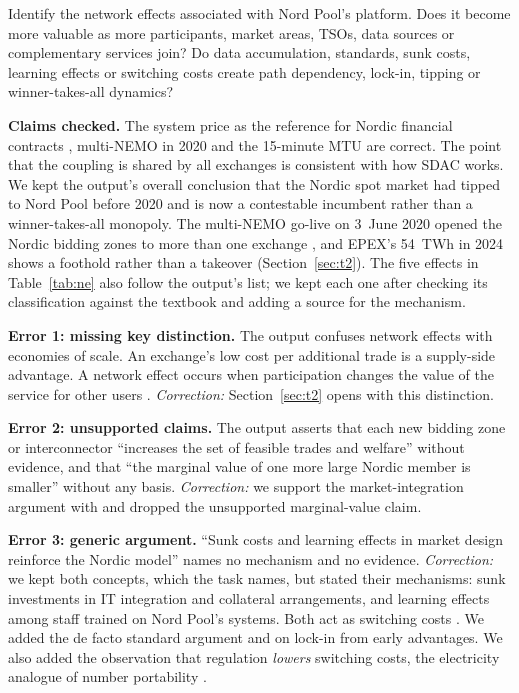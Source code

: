 \begin{promptbox}
Identify the network effects associated with Nord Pool's
platform. Does it become more valuable as more participants,
market areas, TSOs, data sources or complementary services
join? Do data accumulation, standards, sunk costs,
learning effects or switching costs create path dependency,
lock-in, tipping or winner-takes-all dynamics?
\end{promptbox}

\textbf{Claims checked.} The system price as the reference
for Nordic financial contracts \citep{NPPrice},
multi-NEMO in 2020 \citep{EPEX2020} and the 15-minute
MTU \citep{OTE2025} are correct.
The point that the coupling is shared by all exchanges
is consistent with how SDAC works.
We kept the output's overall conclusion that the Nordic
spot market had tipped to Nord Pool before 2020 and is now
a contestable incumbent rather than a winner-takes-all
monopoly. The multi-NEMO go-live on 3~June 2020 opened
the Nordic bidding zones to more than one
exchange \citep{EPEX2020}, and EPEX's 54~TWh in 2024
\citep{EPEX2025} shows a foothold rather than a takeover
(Section~\ref{sec:t2}). The five effects in
Table~\ref{tab:ne} also follow the output's list;
we kept each one after checking its classification against
the textbook \citep[Sections~9.2--9.5]{OverbyAudestad2021}
and adding a source for the mechanism.

\textbf{Error 1: missing key distinction.}
The output confuses network effects with economies of scale.
An exchange's low cost per additional trade is a supply-side advantage.
A network effect occurs when participation changes the value
of the service for other users
\citep[Def.~9.1]{OverbyAudestad2021}.
\emph{Correction:} Section~\ref{sec:t2}
opens with this distinction.

\textbf{Error 2: unsupported claims.}
The output asserts that each new bidding zone or interconnector
``increases the set of feasible trades and welfare''
without evidence, and that ``the marginal value of one more
large Nordic member is smaller'' without any basis.
\emph{Correction:} we support the market-integration
argument with \citet{Newbery2016} and dropped
the unsupported marginal-value claim.

\textbf{Error 3: generic argument.}
``Sunk costs and learning effects in market design reinforce
the Nordic model'' names no mechanism and no evidence.
\emph{Correction:} we kept both concepts, which the task
names, but stated their mechanisms: sunk investments
in IT integration and collateral arrangements,
and learning effects among staff trained on Nord Pool's
systems. Both act as switching costs
\citep[Def.~12.2]{OverbyAudestad2021}.
We added the de facto standard argument
\citep[Def.~15.1]{OverbyAudestad2021}
and \citet{Arthur1989} on lock-in from early advantages.
We also added the observation that regulation
\emph{lowers} switching costs, the electricity analogue
of number portability
\citep[Section~12.6]{OverbyAudestad2021}.

